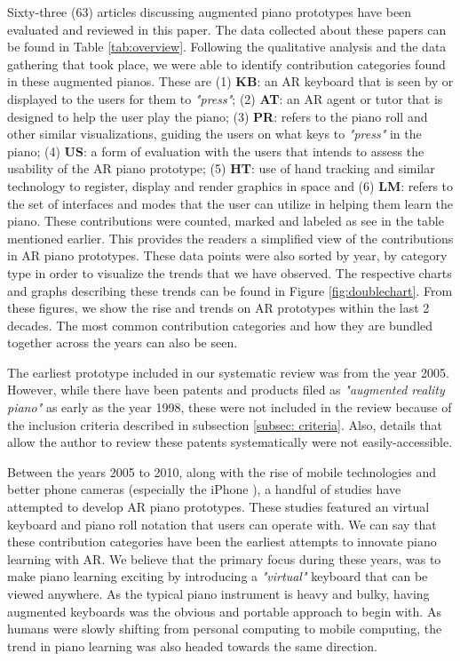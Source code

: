 \documentclass[sigchi, review]{acmart}
\begin{document}
Sixty-three (63) articles discussing augmented piano prototypes have been evaluated and reviewed in this paper. The data collected about these papers can be found in Table \ref{tab:overview}. Following the qualitative analysis and the data gathering that took place, we were able to identify contribution categories found in these augmented pianos. These are (1) \textbf{KB}: an AR keyboard that is seen by or displayed to the users for them to \textit{"press"}; (2) \textbf{AT}: an AR agent or tutor that is designed to help the user play the piano; (3) \textbf{PR}: refers to the piano roll and other similar visualizations, guiding the users on what keys to  \textit{"press"} in the piano; (4) \textbf{US}: a form of evaluation with the users that intends to assess the usability of the AR piano prototype; (5) \textbf{HT}: use of hand tracking and similar technology to register, display and render graphics in space and (6) \textbf{LM}: refers to the set of interfaces and modes that the user can utilize in helping them learn the piano. These contributions were counted, marked and labeled as see in the table mentioned earlier. This provides the readers a simplified view of the contributions in AR piano prototypes. These data points were also sorted by year, by category type in order to visualize the trends that we have observed. The respective charts and graphs describing these trends can be found in Figure \ref{fig:doublechart}. From these figures, we show the rise and trends on AR prototypes within the last 2 decades. The most common contribution categories and how they are bundled together across the years can also be seen. 

The earliest prototype included in our systematic review was from the year 2005. However, while there have been patents and products filed as \textit{"augmented reality piano"} as early as the year 1998, these were not included in the review because of the inclusion criteria described in subsection \ref{subsec: criteria}. Also, details that allow the author to review these patents systematically were not easily-accessible.

Between the years 2005 to 2010, along with the rise of mobile technologies and better phone cameras (especially the iPhone \cite{querashi2012apple}), a handful of studies have attempted to develop AR piano prototypes. These studies featured an virtual keyboard and piano roll notation that users can operate with. We can say that these contribution categories have been the earliest attempts to innovate piano learning with AR. We believe that the primary focus during these years, was to make piano learning exciting by introducing a \textit{"virtual"} keyboard that can be viewed anywhere. As the typical piano instrument is heavy and bulky, having augmented keyboards was the obvious and portable approach to begin with. As humans were slowly shifting from personal computing to mobile computing, the trend in piano learning was also headed towards the same direction.
\end{document}
